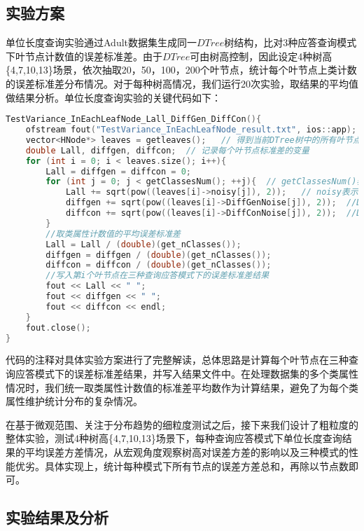 \subsection{实验方案}
单位长度查询实验通过Adult数据集生成同一$DTree$树结构，比对3种应答查询模式下叶节点计数值的误差标准差。由于$DTree$可由树高控制，因此设定4种树高\{4,7,10,13\}场景，依次抽取20，50，100，200个叶节点，统计每个叶节点上类计数的误差标准差分布情况。对于每种树高情况，我们运行20次实验，取结果的平均值做结果分析。单位长度查询实验的关键代码如下：
\begin{lstlisting}[language={C++}, caption={单位长度查询实验}]
TestVariance_InEachLeafNode_Lall_DiffGen_DiffCon(){
	ofstream fout("TestVariance_InEachLeafNode_result.txt", ios::app);
	vector<HNode*> leaves = getleaves();   // 得到当前DTree树中的所有叶节点
	double Lall, diffgen, diffcon;  // 记录每个叶节点标准差的变量
	for (int i = 0; i < leaves.size(); i++){   
		Lall = diffgen = diffcon = 0;       
		for (int j = 0; j < getClassesNum(); ++j){  // getClassesNum()表示类属性个数，遍历每个类属性
			Lall += sqrt(pow((leaves[i]->noisy[j]), 2));   // noisy表示$\tilde{L}_{all}(D)$方式加的噪音
			diffgen += sqrt(pow((leaves[i]->DiffGenNoise[j]), 2));  //DiffGenNoise表示DiffGen方式加的噪音
			diffcon += sqrt(pow((leaves[i]->DiffConNoise[j]), 2));  //DiffConNoise表示DiffCon方式加的噪音
		}
		//取类属性计数值的平均误差标准差
		Lall = Lall / (double)(get_nClasses());  
		diffgen = diffgen / (double)(get_nClasses());
		diffcon = diffcon / (double)(get_nClasses());
		//写入第i个叶节点在三种查询应答模式下的误差标准差结果
		fout << Lall << " ";  
		fout << diffgen << " ";  
		fout << diffcon << endl; 
	}
	fout.close();
}
\end{lstlisting}
代码的注释对具体实验方案进行了完整解读，总体思路是计算每个叶节点在三种查询应答模式下的误差标准差结果，并写入结果文件中。在处理数据集的多个类属性情况时，我们统一取类属性计数值的标准差平均数作为计算结果，避免了为每个类属性维护统计分布的复杂情况。

在基于微观范围、关注于分布趋势的细粒度测试之后，接下来我们设计了粗粒度的整体实验，测试4种树高\{4,7,10,13\}场景下，每种查询应答模式下单位长度查询结果的平均误差方差情况，从宏观角度观察树高对误差方差的影响以及三种模式的性能优劣。具体实现上，统计每种模式下所有节点的误差方差总和，再除以节点数即可。


\subsection{实验结果及分析}

